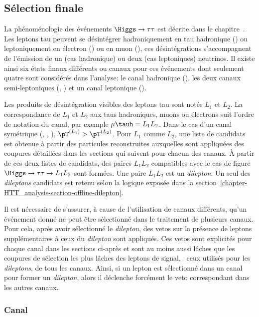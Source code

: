\subsection{Sélection finale}\label{chapter-HTT_analysis-section-offline_selection}
La phénoménologie des événements $\Higgs\to\tau\tau$ est décrite dans le chapitre~.
Les leptons tau peuvent se désintégrer hadroniquement en tau hadronique (\tauh) ou leptoniquement en électron (\ele) ou en muon (\mu), ces désintégrations s'accompagnent de l'émission de un (cas hadronique) ou deux (cas leptoniques) neutrinos.
Il existe ainsi six états finaux différents ou canaux pour ces événements dont seulement quatre sont considérés dans l'analyse:
le canal hadronique (\tauh\tauh),
les deux canaux semi-leptoniques (\mu\tauh, \ele\tauh)
et un canal leptonique (\ele\mu).
\par
Les produits de désintégration visibles des leptons tau sont notés $L_1$ et $L_2$.
La correspondance de $L_1$ et $L_2$ aux taus hadroniques, muons ou électrons suit l'ordre de notation du canal, par exemple $\mu\tauh=L_1L_2$.
Dans le cas d'un canal symétrique (\tauh\tauh, \mu\mu, \ele\ele), $\pT^{(L_1)}>\pT^{(L_2)}$.
Pour $L_1$ comme $L_2$, une liste de candidats est obtenue à partir des particules reconstruites auxquelles sont appliquées des coupures détaillées dans les sections qui suivent pour chacun des canaux.
À partir de ces deux listes de candidats, des paires $L_1L_2$ compatibles avec le cas de figure $\Higgs\to\tau\tau\to L_1L_2$ sont formées.
Une paire $L_1L_2$ est un \emph{dilepton}.
Un seul des \emph{dileptons} candidats est retenu selon la logique exposée dans la section~\ref{chapter-HTT_analysis-section-offline-dilepton}.
\par
Il est nécessaire de s'assurer, à cause de l'utilisation de canaux différents, qu'un événement donné ne peut être sélectionné dans le traitement de plusieurs canaux.
Pour cela, après avoir sélectionné le \emph{dilepton}, des vetos sur la présence de leptons supplémentaires à ceux du \emph{dilepton} sont appliqués.
Ces vetos sont explicités pour chaque canal dans les sections ci-après et sont au moins aussi lâches que les coupures de sélection les plus lâches des leptons de signal, \ie\ ceux utilisés pour les \emph{dileptons}, de tous les canaux.
Ainsi, si un lepton est sélectionné dans un canal pour former un \emph{dilepton}, alors il déclenche forcément le veto correspondant dans les autres canaux.

\subsubsection{Canal \tauh\tauh}\label{chapter-HTT_analysis-section-offline-tt}
